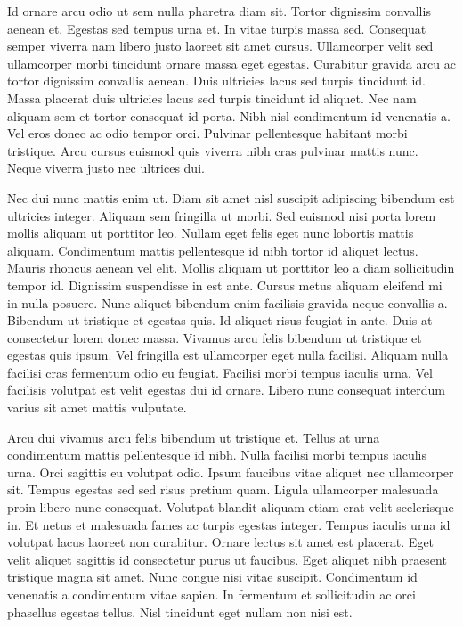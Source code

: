 \documentclass[a4]{report}
\begin{document}
Id ornare arcu odio ut sem nulla pharetra diam sit. Tortor dignissim convallis aenean et. Egestas sed tempus urna et. In vitae turpis massa sed. Consequat semper viverra nam libero justo laoreet sit amet cursus. Ullamcorper velit sed ullamcorper morbi tincidunt ornare massa eget egestas. Curabitur gravida arcu ac tortor dignissim convallis aenean. Duis ultricies lacus sed turpis tincidunt id. Massa placerat duis ultricies lacus sed turpis tincidunt id aliquet. Nec nam aliquam sem et tortor consequat id porta. Nibh nisl condimentum id venenatis a. Vel eros donec ac odio tempor orci. Pulvinar pellentesque habitant morbi tristique. Arcu cursus euismod quis viverra nibh cras pulvinar mattis nunc. Neque viverra justo nec ultrices dui.

Nec dui nunc mattis enim ut. Diam sit amet nisl suscipit adipiscing bibendum est ultricies integer. Aliquam sem fringilla ut morbi. Sed euismod nisi porta lorem mollis aliquam ut porttitor leo. Nullam eget felis eget nunc lobortis mattis aliquam. Condimentum mattis pellentesque id nibh tortor id aliquet lectus. Mauris rhoncus aenean vel elit. Mollis aliquam ut porttitor leo a diam sollicitudin tempor id. Dignissim suspendisse in est ante. Cursus metus aliquam eleifend mi in nulla posuere. Nunc aliquet bibendum enim facilisis gravida neque convallis a. Bibendum ut tristique et egestas quis. Id aliquet risus feugiat in ante. Duis at consectetur lorem donec massa. Vivamus arcu felis bibendum ut tristique et egestas quis ipsum. Vel fringilla est ullamcorper eget nulla facilisi. Aliquam nulla facilisi cras fermentum odio eu feugiat. Facilisi morbi tempus iaculis urna. Vel facilisis volutpat est velit egestas dui id ornare. Libero nunc consequat interdum varius sit amet mattis vulputate.

Arcu dui vivamus arcu felis bibendum ut tristique et. Tellus at urna condimentum mattis pellentesque id nibh. Nulla facilisi morbi tempus iaculis urna. Orci sagittis eu volutpat odio. Ipsum faucibus vitae aliquet nec ullamcorper sit. Tempus egestas sed sed risus pretium quam. Ligula ullamcorper malesuada proin libero nunc consequat. Volutpat blandit aliquam etiam erat velit scelerisque in. Et netus et malesuada fames ac turpis egestas integer. Tempus iaculis urna id volutpat lacus laoreet non curabitur. Ornare lectus sit amet est placerat. Eget velit aliquet sagittis id consectetur purus ut faucibus. Eget aliquet nibh praesent tristique magna sit amet. Nunc congue nisi vitae suscipit. Condimentum id venenatis a condimentum vitae sapien. In fermentum et sollicitudin ac orci phasellus egestas tellus. Nisl tincidunt eget nullam non nisi est.

\newpage{}
\listoffigures
\listoftables
\end{document}
